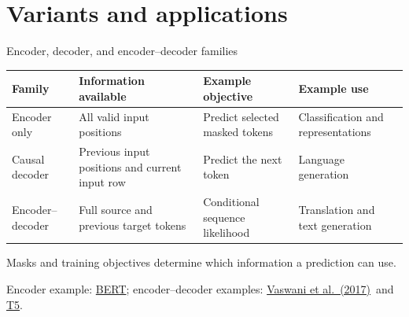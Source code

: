\documentclass[aspectratio=169,11pt]{beamer}
\newcommand{\src}[1]{\par\vfill{\fontsize{7}{8.5}\selectfont\color{muted}#1}\par}
\newcommand{\paper}{\href{https://arxiv.org/abs/1706.03762}{Vaswani et al.\ (2017)}}
\begin{document}
\section{Variants and applications}
\begin{frame}[t]{Encoder, decoder, and encoder--decoder families}
\small
\begin{tabularx}{\textwidth}{@{}lYYY@{}}
\toprule
Family & Information available & Example objective & Example use \\
\midrule
Encoder only & All valid input positions & Predict selected masked tokens & Classification and representations \\
Causal decoder & Previous input positions and current input row & Predict the next token & Language generation \\
Encoder--decoder & Full source and previous target tokens & Conditional sequence likelihood & Translation and text generation \\
\bottomrule
\end{tabularx}
\normalsize
\vspace{3mm}
Masks and training objectives determine which information a prediction can use.
\src{Encoder example: \href{https://arxiv.org/abs/1810.04805}{BERT}; encoder--decoder examples: \paper\ and \href{https://arxiv.org/abs/1910.10683}{T5}.}
\end{frame}
\end{document}
